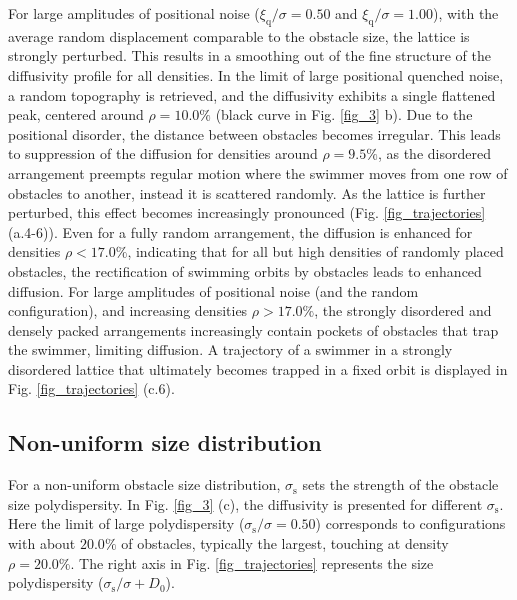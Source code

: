 \documentclass[aps,pre,twocolumn,showpacs,superscriptaddress,amsmath,amssymb,longbibliography]{revtex4-2}
\begin{document}
For large amplitudes of positional noise ($\xi_{\textrm{q}}/\sigma = 0.50$ and $\xi_{\textrm{q}}/\sigma = 1.00$), with the average random displacement comparable to the obstacle size, the lattice is strongly perturbed. This results in a smoothing out of the fine structure of the diffusivity profile for all densities. In the limit of large positional quenched noise, a random topography is retrieved, and the diffusivity exhibits a single flattened peak, centered around $\rho = 10.0 \%$ (black curve in Fig. \ref{fig_3} b). Due to the positional disorder, the distance between obstacles becomes irregular. This leads to suppression of the diffusion for densities around $\rho = 9.5\%$, as the disordered arrangement preempts regular motion where the swimmer moves from one row of obstacles to another, instead it is scattered randomly. As the lattice is further perturbed, this effect becomes increasingly pronounced (Fig. \ref{fig_trajectories} (a.4-6)). Even for a fully random arrangement, the diffusion is enhanced for  densities $\rho < 17.0 \%$, indicating that for all but high densities of randomly placed obstacles, the rectification of swimming orbits by obstacles leads to enhanced diffusion. For large amplitudes of positional noise (and the random configuration), and increasing densities $\rho > 17.0 \%$, the strongly disordered and densely packed arrangements increasingly contain pockets of obstacles that trap the swimmer, limiting diffusion. A trajectory of a swimmer in a strongly disordered lattice that ultimately becomes trapped in a fixed orbit is displayed in Fig. \ref{fig_trajectories} (c.6).


\subsection{Non-uniform size distribution}
For a non-uniform obstacle size distribution, $\sigma_{\textrm{s}}$ sets the strength of the obstacle size polydispersity. In Fig. \ref{fig_3} (c), the diffusivity is presented for different $\sigma_{\textrm{s}}$. Here the limit of large polydispersity ($\sigma_{\textrm{s}}/\sigma = 0.50$) corresponds to configurations with about $20.0 \%$ of obstacles, typically the largest, touching at density $\rho = 20.0 \%$.  The right axis in Fig. \ref{fig_trajectories} represents the size polydispersity ($\sigma_{\textrm{s}}/\sigma + D_{\textrm{0}}$).
\end{document}
